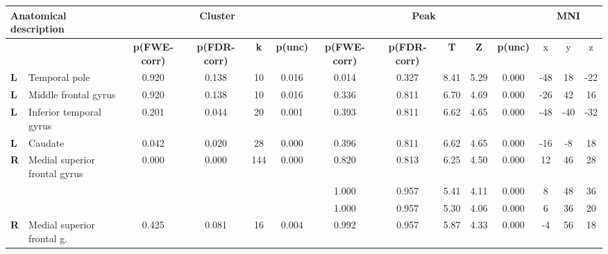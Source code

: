 \begin{landscape}
\begin{table}[!ht]
    \vspace*{-4cm}
    \raggedright
    \tiny
\begin{tabular}{ll|cccc|ccccc|ccc} \\ \hline
        \multicolumn{2}{l}{\textbf{Anatomical description}} & \multicolumn{4}{c}{\textbf{Cluster}} & \multicolumn{5}{c}{\textbf{Peak}} &  \multicolumn{3}{c}{\textbf{MNI}} \\ \hline
        \multicolumn{2}{l}{} & \textbf{p(FWE-corr)} & \textbf{p(FDR-corr)} & \textbf{k} & \textbf{p(unc)} & \textbf{p(FWE-corr)} & \textbf{p(FDR-corr)} & \textbf{T} & \textbf{Z} & \textbf{p(unc)} & x & y & z \\ \hline
        \textbf{L} & Temporal pole & 0.920 & 0.138 & 10 & 0.016 & 0.014 & 0.327 & 8.41 & 5.29 & 0.000 & -48 & 18 & -22 \\
        \textbf{L} & Middle frontal gyrus & 0.920 & 0.138 & 10 & 0.016 & 0.336 & 0.811 & 6.70 & 4.69 & 0.000 & -26 & 42 & 16 \\
        \textbf{L} & Inferior temporal gyrus & 0.201 & 0.044 & 20 & 0.001 & 0.393 & 0.811 & 6.62 & 4.65 & 0.000 & -48 & -40 & -32 \\
        \textbf{L} & Caudate & 0.042 & 0.020 & 28 & 0.000 & 0.396 & 0.811 & 6.62 & 4.65 & 0.000 & -16 & -8 & 18 \\
        \textbf{R} & Medial superior frontal gyrus & 0.000 & 0.000 & 144 & 0.000 & 0.820 & 0.813 & 6.25 & 4.50 & 0.000 & 12 & 46 & 28 \\
        \textbf{} & & & & & & 1.000 & 0.957 & 5.41 & 4.11 & 0.000 & 8 & 48 & 36 \\
        \textbf{} & & & & & & 1.000 & 0.957 & 5.30 & 4.06 & 0.000 & 6 & 36 & 20 \\
        \textbf{R} & Medial superior frontal g. & 0.425 & 0.081 & 16 & 0.004 & 0.992 & 0.957 & 5.87 & 4.33 & 0.000 & -4 & 56 & 18 \\

\end{tabular}
\end{table}
\end{landscape}

